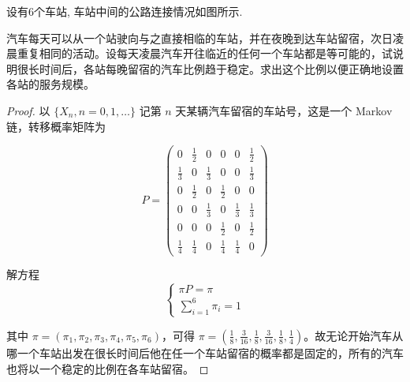 \documentclass[lang=cn,10pt,thmcnt=section]{elegantbook}
\begin{document}
\begin{example}
	设有6个车站, 车站中间的公路连接情况如图所示.

\begin{figure}[h]
    \centering
\end{figure}

汽车每天可以从一个站驶向与之直接相临的车站，并在夜晚到达车站留宿，次日凌晨重复相同的活动。设每天凌晨汽车开往临近的任何一个车站都是等可能的，试说明很长时间后，各站每晚留宿的汽车比例趋于稳定。求出这个比例以便正确地设置各站的服务规模。


\end{example}
\begin{proof}
	以 $\{X_n, n = 0, 1, \ldots\}$ 记第 $n$ 天某辆汽车留宿的车站号，这是一个 Markov 链，转移概率矩阵为

\[
P = \begin{pmatrix}
0 & \frac{1}{2} & 0 & 0 & 0 & \frac{1}{2} \\
\frac{1}{3} & 0 & \frac{1}{3} & 0 & 0 & \frac{1}{3} \\
0 & \frac{1}{2} & 0 & \frac{1}{2} & 0 & 0 \\
0 & 0 & \frac{1}{3} & 0 & \frac{1}{3} & \frac{1}{3} \\
0 & 0 & 0 & \frac{1}{2} & 0 & \frac{1}{2} \\
\frac{1}{4} & \frac{1}{4} & 0 & \frac{1}{4} & \frac{1}{4} & 0
\end{pmatrix}
\]

解方程
\[
\begin{cases}
\pi P = \pi \\
\sum_{i=1}^{6} \pi_i = 1
\end{cases}
\]

其中 $\pi = (\pi_1, \pi_2, \pi_3, \pi_4, \pi_5, \pi_6)$，可得 $\pi = \left(\frac{1}{8}, \frac{3}{16}, \frac{1}{8}, \frac{3}{16}, \frac{1}{8}, \frac{1}{4}\right)$。故无论开始汽车从哪一个车站出发在很长时间后他在任一个车站留宿的概率都是固定的，所有的汽车也将以一个稳定的比例在各车站留宿。
\end{proof}
\end{document}
